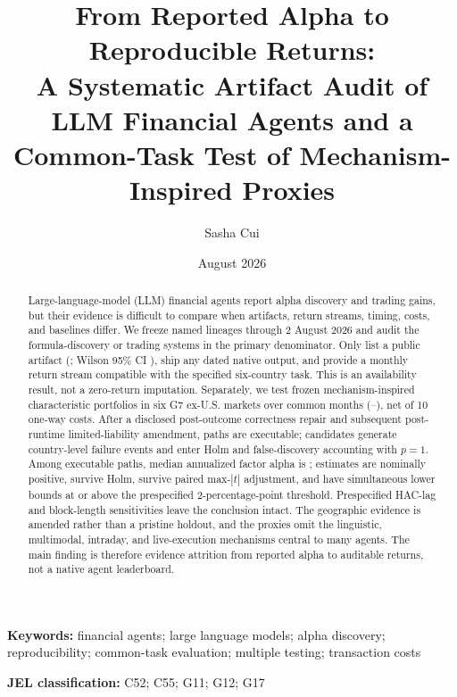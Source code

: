 \documentclass[11pt]{article}
\title{\textbf{\color{Navy}From Reported Alpha to Reproducible Returns:}\\
\large A Systematic Artifact Audit of LLM Financial Agents and a Common-Task Test of Mechanism-Inspired Proxies}
\author{Sasha Cui}
\date{August 2026}
\newcommand{\bps}[1]{\SI{#1}{\text{bp}}}
\begin{document}
\maketitle

\begin{abstract}
Large-language-model (LLM) financial agents report alpha discovery and trading gains, but their evidence is difficult to compare when artifacts, return streams, timing, costs, and baselines differ. We freeze \SystemCount{} named lineages through 2 August 2026 and audit the \MethodSystemCount{} formula-discovery or trading systems in the primary denominator. Only \ArtifactCountFT{} list a public artifact (\ArtifactRateFT{}; Wilson 95\% CI \ArtifactWilsonFT{}), \NativeDatedOutputCount{} ship any dated native output, and \NativeReturnCount{} provide a monthly return stream compatible with the specified six-country task. This is an availability result, not a zero-return imputation. Separately, we test \ProxyCount{} frozen mechanism-inspired characteristic portfolios in six G7 ex-U.S. markets over \RegressionMonthCount{} common months (\RegressionStartMonth{}--\RegressionEndMonth{}), net of \bps{10} one-way costs. After a disclosed post-outcome correctness repair and subsequent post-runtime limited-liability amendment, \ValidProxyCount{} paths are executable; \PathFailureCandidateCount{} candidates generate \PathFailureEventCount{} country-level failure events and enter Holm and false-discovery accounting with $p=1$. Among executable paths, median annualized factor alpha is \MedianAlphaPct{}; \NominalPositiveCount{} estimates are nominally positive, \HolmPositiveCount{} survive Holm, \MaxTPositiveCount{} survive paired max-$|t|$ adjustment, and \EconomicConfirmedCount{} have simultaneous lower bounds at or above the prespecified 2-percentage-point threshold. Prespecified HAC-lag and block-length sensitivities leave the conclusion intact. The geographic evidence is amended rather than a pristine holdout, and the proxies omit the linguistic, multimodal, intraday, and live-execution mechanisms central to many agents. The main finding is therefore evidence attrition from reported alpha to auditable returns, not a native agent leaderboard.
\end{abstract}

\noindent\textbf{Keywords:} financial agents; large language models; alpha discovery; reproducibility; common-task evaluation; multiple testing; transaction costs

\noindent\textbf{JEL classification:} C52; C55; G11; G12; G17
\end{document}
